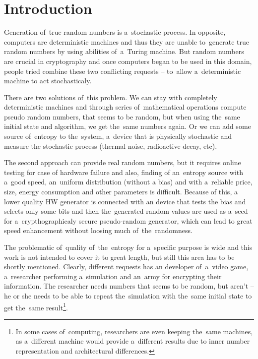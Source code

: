 \chapter{Introduction}
\par{
Generation of~true random numbers is a~stochastic process.
In opposite, computers are deterministic machines 
and thus they are unable to~generate true random numbers by using abilities 
of~a~Turing machine. 
But random numbers are crucial in cryptography and once computers began 
to be used in this domain, people tried combine these two conflicting requests 
-- to~allow a~deterministic machine to act stochasticaly. 
}

\par{
There are two solutions of~this problem. We can stay with completely 
deterministic machines and through series of~mathematical operations 
compute pseudo random numbers, that seems to be random, 
but when using the~same initial state and algorithm, we get the~same 
numbers again. Or we can add some source of~entropy to the~system, 
a~device that is physically stochastic and measure the stochastic process 
(thermal noise, radioactive decay, etc).
}

\par{
The second approach can provide real random numbers, but it requires online 
testing for case of hardware failure and also, finding of an~entropy source with
a~good speed, an~uniform distribution (without a bias) and with a~reliable price,
size, energy consumption and other parameters is difficult. Because of this, 
a lower quality HW generator is connected with an device that tests the bias 
and selects only some bits and then the~generated random values are used 
as a~seed for a~crypthographicaly secure pseudo-random generator, 
which can lead to great speed enhancement without loosing much 
of~the~randomness.
}

\par{
The problematic of~quality of~the~entropy for a~specific purpose is wide 
and this work is not intended to cover it to great length, but still this area 
has to be shortly mentioned. Clearly, different requests has an developer 
of~a~video game, a~researcher performing a~simulation and an~army 
for encrypting their information. 
The researcher needs numbers that seems to be random, but aren't 
-- he or she needs to be able to repeat the~simulation with the~same initial state 
to get the~same result\footnote{In some cases of~computing, 
researchers are even keeping the~same machines, as a~different machine 
would provide a~different results due to inner number representation and architectural differences.\cite{ArithmeticInCloud}}.
}

